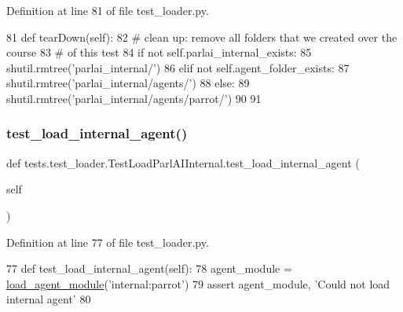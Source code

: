 Definition at line 81 of file test\+\_\+loader.\+py.


\begin{DoxyCode}
81     \textcolor{keyword}{def }tearDown(self):
82         \textcolor{comment}{# clean up: remove all folders that we created over the course}
83         \textcolor{comment}{# of this test}
84         \textcolor{keywordflow}{if} \textcolor{keywordflow}{not} self.parlai\_internal\_exists:
85             shutil.rmtree(\textcolor{stringliteral}{'parlai\_internal/'})
86         \textcolor{keywordflow}{elif} \textcolor{keywordflow}{not} self.agent\_folder\_exists:
87             shutil.rmtree(\textcolor{stringliteral}{'parlai\_internal/agents/'})
88         \textcolor{keywordflow}{else}:
89             shutil.rmtree(\textcolor{stringliteral}{'parlai\_internal/agents/parrot/'})
90 
91 
\end{DoxyCode}
\mbox{\label{classtests_1_1test__loader_1_1TestLoadParlAIInternal_a93e29a3766a0f33e4ea94558b04cb05a}} 
\subsubsection{\texorpdfstring{test\+\_\+load\+\_\+internal\+\_\+agent()}{test\_load\_internal\_agent()}}
{\footnotesize\ttfamily def tests.\+test\+\_\+loader.\+Test\+Load\+Parl\+A\+I\+Internal.\+test\+\_\+load\+\_\+internal\+\_\+agent (\begin{DoxyParamCaption}\item[{}]{self }\end{DoxyParamCaption})}



Definition at line 77 of file test\+\_\+loader.\+py.


\begin{DoxyCode}
77     \textcolor{keyword}{def }test\_load\_internal\_agent(self):
78         agent\_module = \hyperlink{namespaceparlai_1_1core_1_1loader_a8e6a8f524cba24b80e9bd157c2e0ab8b}{load\_agent\_module}(\textcolor{stringliteral}{'internal:parrot'})
79         \textcolor{keyword}{assert} agent\_module, \textcolor{stringliteral}{'Could not load internal agent'}
80 
\end{DoxyCode}


